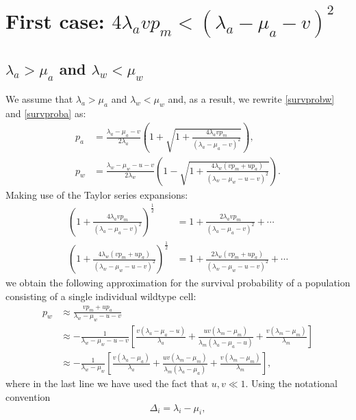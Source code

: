 \documentclass[11pt,a4paper]{article}
\begin{document}
\section{First case: $4\lambda_avp_m<\left(\lambda_a-\mu_a-v\right)^2$}
\subsection{$\lambda_a>\mu_a$ and $\lambda_w<\mu_w$}
We assume that $\lambda_a>\mu_a$ and $\lambda_w<\mu_w$ and, as a result, we rewrite \eqref{survprobw} and \eqref{survproba} as:
\begin{align*}
p_a&=\frac{\lambda_a-\mu_a-v}{2\lambda_a}\left(1+\sqrt{1+\frac{4\lambda_avp_m}{\left(\lambda_a-\mu_a-v\right)^2}}\right),\\
p_w&=\frac{\lambda_w-\mu_w-u-v}{2\lambda_w}\left(1-\sqrt{1+\frac{4\lambda_w\left(vp_m+up_a\right)}{\left(\lambda_w-\mu_w-u-v\right)^2}}\right).
\end{align*}
Making use of the Taylor series expansions:
\begin{align*}
\left(1+\frac{4\lambda_avp_m}{\left(\lambda_a-\mu_a-v\right)^2}\right)^{\frac{1}{2}}&=1+\frac{2\lambda_avp_m}{\left(\lambda_a-\mu_a-v\right)^2}+\cdots\\
\left(1+\frac{4\lambda_w\left(vp_m+up_a\right)}{\left(\lambda_w-\mu_w-u-v\right)^2}\right)^{\frac{1}{2}}&=1+\frac{2\lambda_w\left(vp_m+up_a\right)}{\left(\lambda_w-\mu_w-u-v\right)^2}+\cdots
\end{align*}
we obtain the following approximation for the survival probability of a population consisting of a single individual wildtype cell:
\begin{align}\label{survprobwinitial}
p_w&\approx\frac{vp_m+up_a}{\lambda_w-\mu_w-u-v}\\
\nonumber
&\approx-\frac{1}{\lambda_w-\mu_w-u-v}\left[\frac{v\left(\lambda_a-\mu_a-u\right)}{\lambda_a}+\frac{uv\left(\lambda_m-\mu_m\right)}{\lambda_m\left(\lambda_a-\mu_a-u\right)}+\frac{v\left(\lambda_m-\mu_m\right)}{\lambda_m}\right]\\ \label{survprobw2}
&\approx-\frac{1}{\lambda_w-\mu_w}\left[\frac{v\left(\lambda_a-\mu_a\right)}{\lambda_a}+\frac{uv\left(\lambda_m-\mu_m\right)}{\lambda_m\left(\lambda_a-\mu_a\right)}+\frac{v\left(\lambda_m-\mu_m\right)}{\lambda_m}\right],
\end{align}
where in the last line we have used the fact that $u,v\ll1$. Using the notational convention
\begin{equation}\label{notationalconv}
\Delta_i=\lambda_i-\mu_i,
\end{equation}
\end{document}
